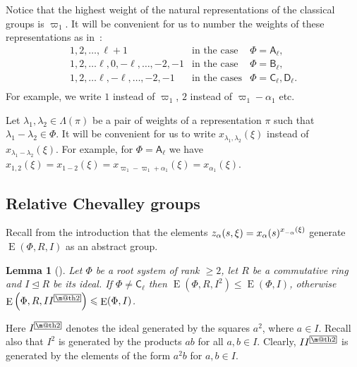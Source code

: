 \documentclass[oneside, 12pt]{amsart}
\makeatletter
\theoremstyle{plain}
\numberwithin{equation}{section}
\newtheorem{lemma}{Lemma}
\numberwithin{lemma}{section}
\theoremstyle{definition}
\theoremstyle{remark}
\newtheorem{rem}[lemma]{Remark}
\DeclareMathOperator{\SO}{SO}
\DeclareMathOperator{\E}{E}
\newcommand{\rA}{\mathsf{A}}
\newcommand{\rB}{\mathsf{B}}
\newcommand{\rC}{\mathsf{C}}
\newcommand{\rD}{\mathsf{D}}
\newcommand{\indexbox}[1]{\text{\fboxsep=.1em\fbox{\m@th$\displaystyle#1$}}}
\def\ssub#1{\mathchoice
   {_{\lower2pt\hbox{$\scriptstyle #1$}}}
   {_{\lower2pt\hbox{$\scriptstyle #1$}}}
   {_{\lower1.5pt\hbox{$\scriptscriptstyle #1$}}}
   {_{\!\lower1.5pt\hbox{$\scriptscriptstyle #1$}}}}
\makeatother
\begin{document}
Notice that the highest weight of the natural representations of the classical groups is $\varpi_1$.
It will be convenient for us to number the weights of these representations as in~\cite[\S~1B]{St78}:
\[\begin{array}{cll}
  1, 2, \ldots, \ell+1 & \text{in the case} & \Phi =\rA_\ell, \\
  1, 2, \ldots \ell, 0, -\ell, \ldots, -2, -1 & \text{in the case} & \Phi =\rB_\ell, \\
  1, 2, \ldots \ell, -\ell, \ldots, -2, -1 & \text{in the cases}   & \Phi =\rC_\ell, \rD_\ell. \\
\end{array}\]
For example, we write $1$ instead of $\varpi_1$, $2$ instead of $\varpi_1-\alpha_1$ etc.

Let $\lambda_1, \lambda_2 \in \Lambda(\pi)$ be a pair of weights of a representation $\pi$ such that $\lambda_1-\lambda_2\in \Phi$.
It will be convenient for us to write $x_{\lambda_1, \lambda_2}(\xi)$ instead of $x_{\lambda_1-\lambda_2}(\xi)$.
For example, for $\Phi=\rA_\ell$ we have $x_{1, 2}(\xi)=x_{1-2}(\xi)=x_{\varpi_1 - \varpi_1 + \alpha_1}(\xi) = x_{\alpha_1}(\xi)$.


\subsection{Relative Chevalley groups}\label{sec:relative-elementary}
Recall from the introduction that the elements $z_\alpha(s, \xi) = x_\alpha(s)^{x\ssub{-\alpha}(\xi)}$ generate $\E(\Phi, R, I)$ as an abstract group.

\begin{lemma}[{\cite[Corollary~3.3]{S}}]\label{lemma:Stepanov-ideal}
Let $\Phi$ be a root system of rank $\geqslant2$, let $R$ be a commutative ring and $I\trianglelefteq R$ be its ideal.
If $\Phi\neq\rC_\ell$ then $\E\left(\Phi, R, I^2\right)\leqslant\E(\Phi, I)$, otherwise $\E\left(\Phi, R, II^{\indexbox{2}}\right)\leqslant\E(\Phi, I)$.
\end{lemma}
Here $I^{\indexbox{2}}$ denotes the ideal generated by the squares $a^2$, where $a\in I$.
Recall also that $I^2$ is generated by the products $ab$ for all $a, b\in I$.
Clearly, $II^{\indexbox{2}}$ is generated by the elements of the form $a^2b$ for $a, b\in I$.
\end{document}
